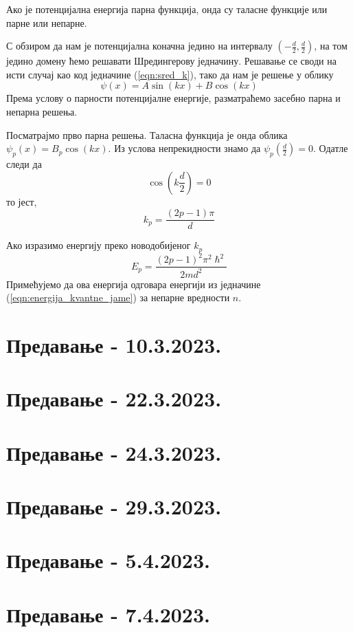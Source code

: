 \documentclass{tufte-handout} %
\theoremstyle{definition}
\theoremstyle{remark}
\newcommand{\hb}{\hslash}
\begin{document}
\begin{tcolorbox}[
	colframe=black,colback=red!35!white]\label{box:paran_potencijal}
	Ако је потенцијална енергија парна функција, онда су таласне функције или парне или непарне.
\end{tcolorbox}
С обзиром да нам је потенцијална коначна једино на интервалу $\left(-\frac{d}{2}, \frac{d}{2}\right)$, на том једино домену ћемо решавати Шредингерову једначину. Решавање се своди на исти случај као код једначине (\ref{eqn:sred_k}), тако да нам је решење у облику
\begin{equation}
	\psi(x) = A\sin(kx) + B\cos(kx)
\end{equation}
Према услову о парности потенцијалне енергије, разматраћемо засебно парна и непарна решења.\par
Посматрајмо прво парна решења. Таласна функција је онда облика $\psi_p(x) = B_p\cos(kx)$. Из услова непрекидности знамо да $\psi_p\left(\frac{d}{2}\right)=0$. Одатле следи да $$\cos\left(k\frac{d}{2}\right)=0$$то јест, $$k_p=\frac{(2p-1)\pi}{d}$$\par Ако изразимо енергију преко новодобијеног $k_p$
\begin{equation}\label{eqn:energija_parnih_stanja_kvantne_jame}
	E_p = \frac{(2p-1)^2 \pi^2 \hb^2}{2md^2}
\end{equation}
Примећујемо да ова енергија одговара енергији из једначине (\ref{eqn:energija_kvantne_jame}) за непарне вредности $n$.
\newpage
\section{Предавање - 10.3.2023.}
\section{Предавање - 22.3.2023.}
\section{Предавање - 24.3.2023.}
\section{Предавање - 29.3.2023.}
\section{Предавање - 5.4.2023.}
\section{Предавање - 7.4.2023.}
\end{document}
